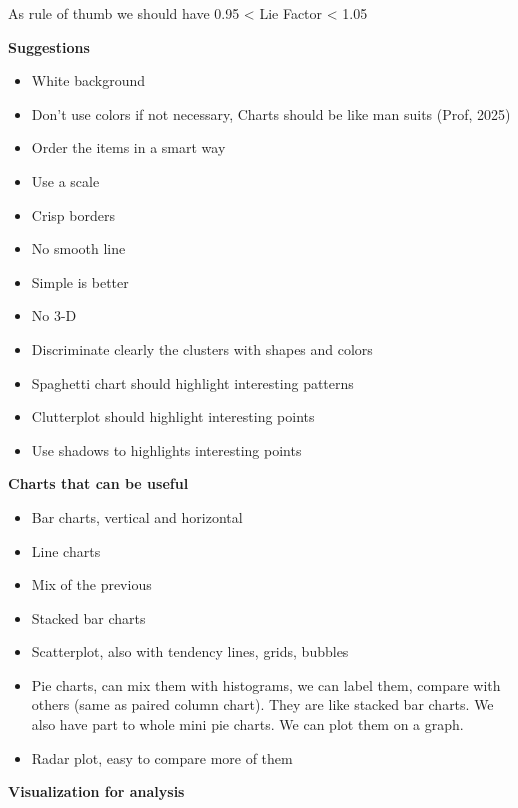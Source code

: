 As rule of thumb we should have 0.95 < Lie Factor < 1.05

\newpage

\textbf{Suggestions}

\begin{itemize}
    \item White background
    \item Don't use colors if not necessary, Charts should be like man suits (Prof, 2025)
    \item Order the items in a smart way
    \item Use a scale
    \item Crisp borders
    \item No smooth line
    \item Simple is better
    \item No 3-D
    \item Discriminate clearly the clusters with shapes and colors
    \item Spaghetti chart should highlight interesting patterns
    \item Clutterplot should highlight interesting points
    \item Use shadows to highlights interesting points
\end{itemize}

\vspace{10pt}

\textbf{Charts that can be useful}

\begin{itemize}
    \item Bar charts, vertical and horizontal
    \item Line charts
    \item Mix of the previous
    \item Stacked bar charts
    \item Scatterplot, also with tendency lines, grids, bubbles
    \item Pie charts, can mix them with histograms, we can label them, compare with others (same as paired column chart). They are like stacked bar charts. We also have part to whole mini pie charts. We can plot them on a graph.
    \item  Radar plot, easy to compare more of them
\end{itemize}

\vspace{10pt}

\textbf{Visualization for analysis}


